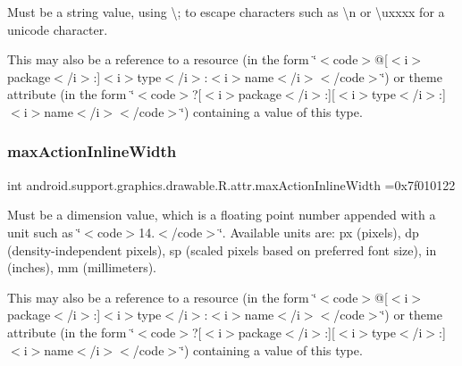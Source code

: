 Must be a string value, using \textquotesingle{}\textbackslash{};\textquotesingle{} to escape characters such as \textquotesingle{}\textbackslash{}n\textquotesingle{} or \textquotesingle{}\textbackslash{}uxxxx\textquotesingle{} for a unicode character. 

This may also be a reference to a resource (in the form \char`\"{}$<$code$>$@\mbox{[}$<$i$>$package$<$/i$>$\+:\mbox{]}$<$i$>$type$<$/i$>$\+:$<$i$>$name$<$/i$>$$<$/code$>$\char`\"{}) or theme attribute (in the form \char`\"{}$<$code$>$?\mbox{[}$<$i$>$package$<$/i$>$\+:\mbox{]}\mbox{[}$<$i$>$type$<$/i$>$\+:\mbox{]}$<$i$>$name$<$/i$>$$<$/code$>$\char`\"{}) containing a value of this type. \mbox{\label{classandroid_1_1support_1_1graphics_1_1drawable_1_1R_1_1attr_a863053ef13b6235c63d7fb73887b995d}} 
\subsubsection{\texorpdfstring{max\+Action\+Inline\+Width}{maxActionInlineWidth}}
{\footnotesize\ttfamily int android.\+support.\+graphics.\+drawable.\+R.\+attr.\+max\+Action\+Inline\+Width =0x7f010122\hspace{0.3cm}{\ttfamily [static]}}

Must be a dimension value, which is a floating point number appended with a unit such as \char`\"{}$<$code$>$14.\+5sp$<$/code$>$\char`\"{}. Available units are\+: px (pixels), dp (density-\/independent pixels), sp (scaled pixels based on preferred font size), in (inches), mm (millimeters). 

This may also be a reference to a resource (in the form \char`\"{}$<$code$>$@\mbox{[}$<$i$>$package$<$/i$>$\+:\mbox{]}$<$i$>$type$<$/i$>$\+:$<$i$>$name$<$/i$>$$<$/code$>$\char`\"{}) or theme attribute (in the form \char`\"{}$<$code$>$?\mbox{[}$<$i$>$package$<$/i$>$\+:\mbox{]}\mbox{[}$<$i$>$type$<$/i$>$\+:\mbox{]}$<$i$>$name$<$/i$>$$<$/code$>$\char`\"{}) containing a value of this type. \mbox{\label{classandroid_1_1support_1_1graphics_1_1drawable_1_1R_1_1attr_ab2420a7f7c2b02e8e9ef42ff1c549c94}} 
